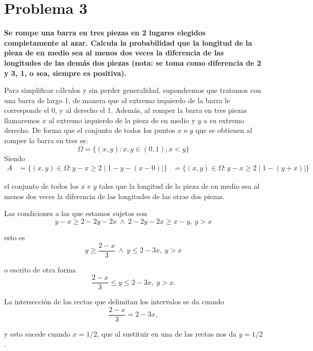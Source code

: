 \section*{Problema 3}
\textbf{Se rompe una barra en tres piezas en 2 lugares elegidos completamente al azar. Calcula la probabilidad que la longitud de la pieza de en medio sea al menos dos veces la diferencia de las longitudes de las demás dos piezas (nota: se toma como diferencia de 2 y 3, 1, o sea, siempre es positiva).}

Para simplificar cálculos y sin perder generalidad, supondremos que tratamos con una barra de largo 1, de manera que al extremo izquierdo de la barra le corresponde el 0, y al derecho el 1. Además, al romper la barra en tres piezas llamaremos $x$ al extremo izquierdo de la pieza de en medio y $y$ a su extremo derecho. De forma que el conjunto de todos los puntos $x$ e $y$ que se obtienen al romper la barra en tres es:
\begin{equation*}
    \Omega = \{(x,y):x,y\in \left(0,1\right), x < y \}
\end{equation*}
Siendo
\begin{align*}
    A & = \{(x,y)\in \Omega: y-x \geq 2\mid 1-y - (x-0) \mid\}
      & = \{(x,y)\in \Omega: y-x \geq 2\mid 1-(y+x) \mid\}
\end{align*}

el conjunto de todos los $x$ e $y$ tales que la longitud de la pieza de en medio sea al menos dos veces la diferencia de las longitudes de las otras dos piezas.

Las condiciones a las que estamos sujetos son
\begin{equation*}
    y-x\geq 2-2y-2x\ \land\ 2-2y-2x \geq x-y,\ y>x
\end{equation*}

esto es
\begin{equation*}
    y\geq \frac{2-x}{3}\ \land\ y\leq2-3x,\ y>x
\end{equation*}

o escrito de otra forma
\begin{equation*}
    \frac{2-x}{3}\leq y\leq 2-3x,\ y>x.
\end{equation*}

La intersección de las rectas que delimitan los intervalos se da cuando
\begin{equation*}
    \frac{2-x}{3}= 2-3x,
\end{equation*}

y esto sucede cuando $x = 1/2$, que al sustituir en una de las rectas nos da $y=1/2$.

